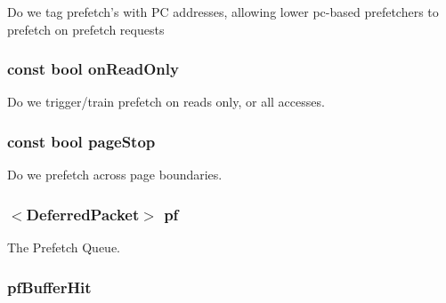 \label{classBasePrefetcher_a632f5ff02feaeadf06e58c82f3fb43c3}
Do we tag prefetch's with PC addresses, allowing lower pc-\/based prefetchers to prefetch on prefetch requests \hypertarget{classBasePrefetcher_a009f56092b97c79cde580c4ae5e12599}{
\subsubsection[{onReadOnly}]{\setlength{\rightskip}{0pt plus 5cm}const bool {\bf onReadOnly}}}
\label{classBasePrefetcher_a009f56092b97c79cde580c4ae5e12599}
Do we trigger/train prefetch on reads only, or all accesses. \hypertarget{classBasePrefetcher_a8e2ec9b566b10d5b73a5d9fe6a90b058}{
\subsubsection[{pageStop}]{\setlength{\rightskip}{0pt plus 5cm}const bool {\bf pageStop}}}
\label{classBasePrefetcher_a8e2ec9b566b10d5b73a5d9fe6a90b058}
Do we prefetch across page boundaries. \hypertarget{classBasePrefetcher_acdef622ce8eca64ce81e25e37f0bc22e}{
\subsubsection[{pf}]{$<${\bf DeferredPacket}$>$ {\bf pf}}}
\label{classBasePrefetcher_acdef622ce8eca64ce81e25e37f0bc22e}
The Prefetch Queue. \hypertarget{classBasePrefetcher_a2df98c96edba641dbec623185d5c801b}{
\subsubsection[{pfBufferHit}]{ {\bf pfBufferHit}}}
\label{classBasePrefetcher_a2df98c96edba641dbec623185d5c801b}
